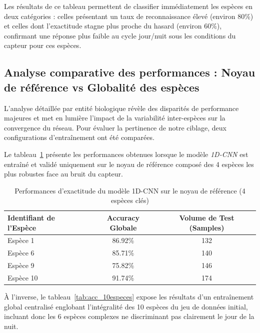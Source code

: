 \documentclass[12pt,a4paper,twoside]{article}
\begin{document}
Les résultats de ce tableau permettent de classifier immédiatement les espèces en deux catégories : celles présentant un taux de reconnaissance élevé (environ 80\%) et celles dont l'exactitude stagne plus proche du hasard (environ 60\%), confirmant une réponse plus faible au cycle jour/nuit sous les conditions du capteur pour ces espèces.

\subsection{Analyse comparative des performances : Noyau de référence vs Globalité des espèces}
\label{subsec:perf_especes}

L'analyse détaillée par entité biologique révèle des disparités de performance majeures et met en lumière l'impact de la variabilité inter-espèces sur la convergence du réseau. Pour évaluer la pertinence de notre ciblage, deux configurations d'entraînement ont été comparées.

Le tableau~\ref{tab:acc_4especes} présente les performances obtenues lorsque le modèle \textit{1D-CNN} est entraîné et validé uniquement sur le noyau de référence composé des 4 espèces les plus robustes face au bruit du capteur.

\begin{table}[htbp]
\centering
\caption{Performances d'exactitude du modèle 1D-CNN sur le noyau de référence (4 espèces clés)}
\label{tab:acc_4especes}
\begin{tabular}{lcc}
\toprule
\textbf{Identifiant de l'Espèce} & \textbf{Accuracy Globale} & \textbf{Volume de Test (Samples)} \\ 
\midrule
Espèce 1 & 86.92\% & 132 \\
Espèce 6 & 85.71\% & 140 \\
Espèce 9 & 75.82\% & 146 \\
Espèce 10 & 91.74\% & 174 \\ 
\bottomrule
\end{tabular}
\end{table}

À l'inverse, le tableau~\ref{tab:acc_10especes} expose les résultats d'un entraînement global centralisé englobant l'intégralité des 10 espèces du jeu de données initial, incluant donc les 6 espèces complexes ne discriminant pas clairement le jour de la nuit.
\end{document}
